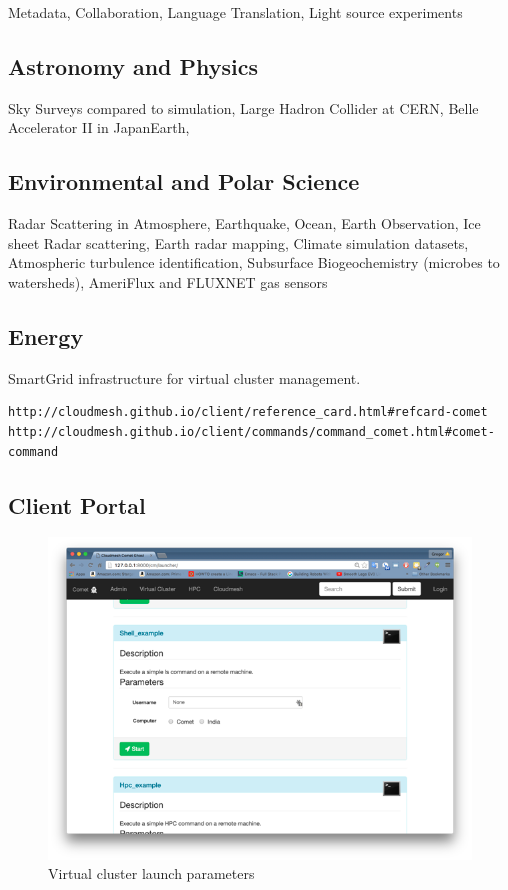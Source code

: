 Metadata, Collaboration, Language Translation, Light source
experiments

\subsection{Astronomy and Physics} 

Sky Surveys compared to simulation, Large Hadron Collider at CERN,
Belle Accelerator II in JapanEarth,

\subsection{Environmental and Polar Science} 

Radar Scattering in Atmosphere, Earthquake, Ocean, Earth Observation,
Ice sheet Radar scattering, Earth radar mapping, Climate simulation
datasets, Atmospheric turbulence identification, Subsurface
Biogeochemistry (microbes to watersheds), AmeriFlux and FLUXNET gas
sensors

\subsection{Energy} 

SmartGrid infrastructure for virtual cluster management.



\begin{verbatim}
http://cloudmesh.github.io/client/reference_card.html#refcard-comet
http://cloudmesh.github.io/client/commands/command_comet.html#comet-command
\end{verbatim}


\subsection{Client Portal}

\begin{figure}[htb] 
  \centering 
    \includegraphics[width=1.0\columnwidth]{images/client/Picture6.png} 
    \caption{Virtual cluster launch parameters}
    \label{F:6}
\end{figure} 

